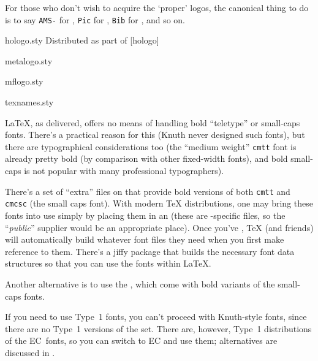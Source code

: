For those who don't wish to acquire the `proper' logos, the canonical
thing to do is to say \texttt{AMS-}
for \AMSTeX{}, \texttt{Pic}
for \pictex{}, \texttt{Bib}
for \BibTeX{}, and so on.
\begin{ctanrefs}
\item[hologo.sty]Distributed as part of [hologo]
\item[metalogo.sty]
\item[mflogo.sty]
\item[texnames.sty]
\end{ctanrefs}


\LaTeX{}, as delivered, offers no means of handling bold ``teletype''
or small-caps fonts.  There's a practical reason for this (Knuth never
designed such fonts), but there are typographical considerations too
(the ``medium weight'' \texttt{cmtt} font is already pretty bold (by
comparison with other fixed-width fonts), and bold small-caps is not
popular with many professional typographers).

There's a set of ``extra'' \MF{} files on  that provide bold
versions of both \texttt{cmtt} and \texttt{cmcsc} (the small caps font).  With
modern \TeX{} distributions, one may bring these fonts into use simply
by placing them in an %
(these are \AllTeX{}-specific files, so the ``\emph{public}'' supplier
would be an appropriate place).  Once you've %
,
\TeX{} (and friends) will automatically build whatever font files they
need when you first make reference to them.  There's a jiffy package
 that builds the necessary font data structures
so that you can use the fonts within \LaTeX{}.

Another alternative is to use the ,
which come with bold variants of the small-caps fonts.

If you need to use Type~1 fonts, you can't proceed with Knuth-style
fonts, since there are no Type~1 versions of the 
set.  There are, however, Type~1 distributions of the EC~fonts, so you
can switch to EC and use them; alternatives are discussed in
.

